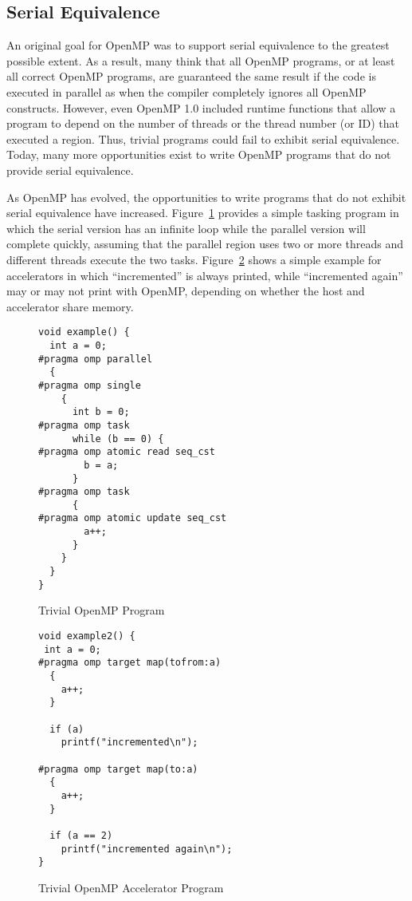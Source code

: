 \subsection{Serial Equivalence}
\label{sub:serial_equivalence}

An original goal for OpenMP was to support serial equivalence to the 
greatest possible extent. As a result, many think that all OpenMP programs, 
or at least all correct OpenMP programs, are guaranteed the same result
if the code is executed in parallel as when the compiler completely 
ignores all OpenMP constructs. However, even OpenMP 1.0 included runtime
functions that allow a program to depend on the number of threads or the
thread number (or ID) that executed a region. Thus, trivial programs could
fail to exhibit serial equivalence. Today, many more opportunities exist
to write OpenMP programs that do not provide serial equivalence. 

As OpenMP has evolved, the opportunities to write programs that do not
exhibit serial equivalence have increased. Figure~\ref{fig:trivial_task} 
provides a simple tasking program in which the serial version has an infinite 
loop while the parallel version will complete quickly, assuming that the 
parallel region uses two or more threads and different threads execute the 
two tasks. Figure~\ref{fig:trivial_target} shows a simple example for 
accelerators in which ``incremented'' is always printed, while 
``incremented again'' may or may not print with OpenMP, depending on 
whether the host and accelerator share memory. 

\begin{figure}
\begin{verbatim}
void example() {
  int a = 0;
#pragma omp parallel
  {
#pragma omp single
    {
      int b = 0;
#pragma omp task
      while (b == 0) {
#pragma omp atomic read seq_cst
        b = a;
      }
#pragma omp task
      {
#pragma omp atomic update seq_cst
        a++;
      }
    }
  }
}
\end{verbatim}
\caption{Trivial OpenMP Program\label{fig:trivial_task}}
\end{figure}

\begin{figure}
\begin{verbatim}
void example2() {
 int a = 0;
#pragma omp target map(tofrom:a)
  {
    a++;
  }

  if (a)
    printf("incremented\n");
  
#pragma omp target map(to:a)
  {
    a++;
  }

  if (a == 2)
    printf("incremented again\n");
}
\end{verbatim}
\caption{Trivial OpenMP Accelerator Program\label{fig:trivial_target}}
\end{figure}


